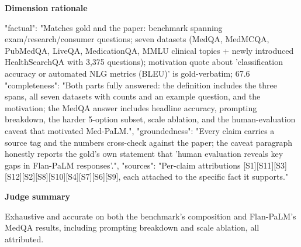 \documentclass[10pt]{article}
\begin{document}
\textbf{Dimension rationale}
\begin{EvidenceText}
{
  "factual": "Matches gold and the paper: benchmark spanning exam/research/consumer questions; seven datasets (MedQA, MedMCQA, PubMedQA, LiveQA, MedicationQA, MMLU clinical topics + newly introduced HealthSearchQA with 3,375 questions); motivation quote about 'classification accuracy or automated NLG metrics (BLEU)' is gold-verbatim; 67.6%
  "completeness": "Both parts fully answered: the definition includes the three spans, all seven datasets with counts and an example question, and the motivation; the MedQA answer includes headline accuracy, prompting breakdown, the harder 5-option subset, scale ablation, and the human-evaluation caveat that motivated Med-PaLM.",
  "groundedness": "Every claim carries a source tag and the numbers cross-check against the paper; the caveat paragraph honestly reports the gold's own statement that 'human evaluation reveals key gaps in Flan-PaLM responses'.",
  "sources": "Per-claim attributions [S1][S11][S3][S12][S2][S8][S10][S4][S7][S6][S9], each attached to the specific fact it supports."
}
\end{EvidenceText}

\textbf{Judge summary}
\begin{EvidenceText}
Exhaustive and accurate on both the benchmark's composition and Flan-PaLM's MedQA results, including prompting breakdown and scale ablation, all attributed.
\end{EvidenceText}
\end{document}
